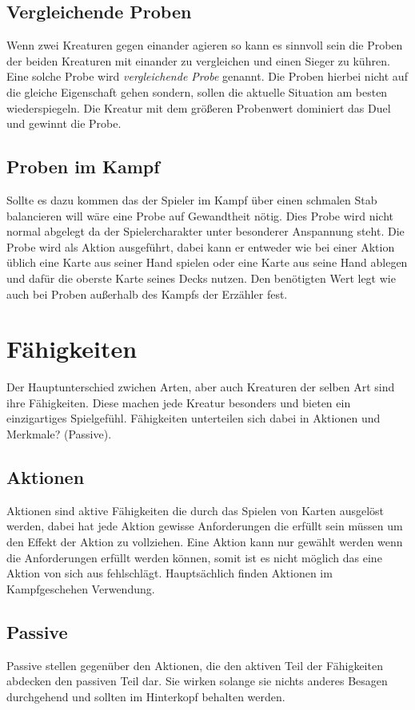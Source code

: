 \subsection*{Vergleichende Proben}
Wenn zwei Kreaturen gegen einander agieren so kann es sinnvoll sein die Proben der beiden Kreaturen mit einander zu vergleichen und einen Sieger zu kühren. Eine solche Probe wird \textit{vergleichende Probe} genannt. Die Proben hierbei nicht auf die gleiche Eigenschaft gehen sondern, sollen die aktuelle Situation am besten wiederspiegeln. Die Kreatur mit dem größeren Probenwert dominiert das Duel und gewinnt die Probe.

\subsection*{Proben im Kampf}
Sollte es dazu kommen das der Spieler im Kampf über einen schmalen Stab balancieren will wäre eine Probe auf Gewandtheit nötig. Dies Probe wird nicht normal abgelegt da der Spielercharakter unter besonderer Anspannung steht.
Die Probe wird als Aktion ausgeführt, dabei kann er entweder wie bei einer Aktion üblich eine Karte aus seiner Hand spielen oder eine Karte aus seine Hand ablegen und dafür die oberste Karte seines Decks nutzen. Den benötigten Wert legt wie auch bei Proben außerhalb des Kampfs der Erzähler fest.


\section{Fähigkeiten}
Der Hauptunterschied zwichen Arten, aber auch Kreaturen der selben Art sind ihre Fähigkeiten. Diese machen jede Kreatur besonders und bieten ein einzigartiges Spielgefühl.
Fähigkeiten unterteilen sich dabei in Aktionen und Merkmale? (Passive).

\subsection*{Aktionen}
Aktionen sind aktive Fähigkeiten die durch das Spielen von Karten ausgelöst werden, dabei hat jede Aktion gewisse Anforderungen die erfüllt sein müssen um den Effekt der Aktion zu vollziehen. Eine Aktion kann nur gewählt werden wenn die Anforderungen erfüllt werden können, somit ist es nicht möglich das eine Aktion von sich aus fehlschlägt. Hauptsächlich finden Aktionen im Kampfgeschehen Verwendung. 

\subsection*{Passive}
Passive stellen gegenüber den Aktionen, die den aktiven Teil der Fähigkeiten abdecken den passiven Teil dar. Sie wirken solange sie nichts anderes Besagen durchgehend und sollten im Hinterkopf behalten werden. 


